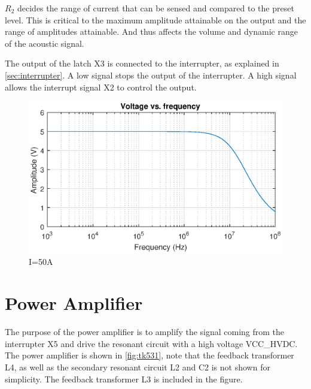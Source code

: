 $R_2$ decides the range of current that can be sensed and compared to the preset level. This is critical to the maximum amplitude attainable on the output and the range of amplitudes attainable. And thus affects the volume and dynamic range of the acoustic signal.

The output of the latch X3 is connected to the interrupter, as explained in \cref{sec:interrupter}. A low signal stops the output of the interrupter. A high signal allows the interrupt signal X2 to control the output.


\begin{figure}
    \centering
    \includegraphics[width=\textwidth]{img/LimiterTransfer.eps}
    \caption{I=50A}
    \label{fig:limitertransfer}
\end{figure}




\newpage
\section{Power Amplifier}

The purpose of the power amplifier is to amplify the signal coming from the interrupter X5 and drive the resonant circuit with a high voltage VCC\_HVDC. The power amplifier is shown in \cref{fig:tk531}, note that the feedback transformer L4, as well as the secondary resonant circuit L2 and C2 is not shown for simplicity. The feedback transformer L3 is included in the figure.

